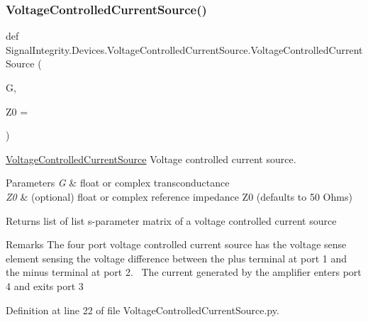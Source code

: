 \subsubsection{\texorpdfstring{Voltage\+Controlled\+Current\+Source()}{VoltageControlledCurrentSource()}}
{\footnotesize\ttfamily def Signal\+Integrity.\+Devices.\+Voltage\+Controlled\+Current\+Source.\+Voltage\+Controlled\+Current\+Source (\begin{DoxyParamCaption}\item[{}]{G,  }\item[{}]{Z0 = {} }\end{DoxyParamCaption})}



\hyperlink{namespaceSignalIntegrity_1_1Devices_1_1VoltageControlledCurrentSource}{Voltage\+Controlled\+Current\+Source} Voltage controlled current source. 


\begin{DoxyParams}{Parameters}
{\em G} & float or complex transconductance \\
\hline
{\em Z0} & (optional) float or complex reference impedance Z0 (defaults to 50 Ohms) \\
\hline
\end{DoxyParams}
\begin{DoxyReturn}{Returns}
list of list s-\/parameter matrix of a voltage controlled current source 
\end{DoxyReturn}
\begin{DoxyRemark}{Remarks}
The four port voltage controlled current source has the voltage sense element sensing the voltage difference between the plus terminal at port 1 and the minus terminal at port 2.~\newline
 The current generated by the amplifier enters port 4 and exits port 3 
\end{DoxyRemark}


Definition at line 22 of file Voltage\+Controlled\+Current\+Source.\+py.

